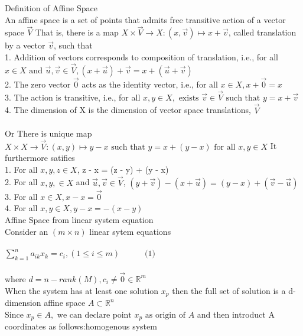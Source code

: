 \documentclass[10pt]{article}
\begin{document}
\pagebreak
Definition of Affine Space\\
An affine space is a set of points that admits free transitive action of a vector space $\vec{V}$ That is, there is a map $X \times \vec{V} \rightarrow X:(x, \vec{v}) \mapsto x + \vec{v}$, called translation by a vector $\vec{v}$, such that\\
1. Addition of vectors corresponds to composition of translation, i.e., for all $x \in X \text{ and } \vec{u}, \vec{v} \in \vec{V}, (x + \vec{u}) + \vec{v} = x + (\vec{u} + \vec{v})$\\ 
2. The zero vector $\vec{0}$ acts as the identity vector, i.e., for all $x \in X, x + \vec{0} = x$\\
3. The action is transitive, i.e., for all $x, y \in X, \text{ exists } \vec{v} \in \vec{V} \text{ such that } y = x + \vec{v}$\\
4. The dimension of X is the dimension of vector space translations, $\vec{V}$\\\\
Or There is unique map\\
$X \times X \rightarrow \vec{V}:(x, y) \mapsto y - x \text{ such that } y = x + (y - x) \text{ for all }x, y \in X$
It furthermore satifies\\ 
1. For all $x, y, z \in X$, z - x = (z - y) + (y - x)\\
2. For all $x, y, \in X$ and $\vec{u}, \vec{v} \in \vec{V}$, $ (y + \vec{v}) - (x + \vec{u}) = (y - x) + (\vec{v} - \vec{u})$\\
3. For all $x \in X, x - x = \vec{0}$\\
4. For all $x, y \in X, y - x = -(x - y)$\\

Affine Space from linear system equation\\
Consider an $(m \times n)$ linear sytem equations\\\\
$\sum_{k=1}^{n} a_{i k} x_{k} = c_{i}, (1 \leq i \leq m) \quad\quad\quad \text{(1)}$\\\\
where $d = n - rank(M), c_{i} \ne \vec{0} \in \mathbb{R}^{m}$\\
When the system has at least one solution $x_{p}$ then the full set of solution is a d-dimension affine space
$A \subset \mathbb{R}^{n}$\\ 
Since $x_{p} \in A, \text{ we can declare point } x_{p} \text{ as origin of } A$ and then introduct A coordinates as follows:homogenous system\\
\end{document}
